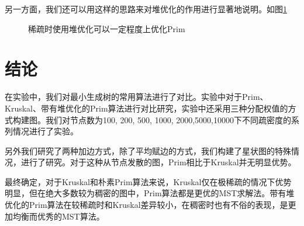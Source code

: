 \documentclass[UTF8]{ctexart}
\begin{document}
另一方面，我们还可以用这样的思路来对堆优化的作用进行显著地说明。如图\ref{fig:conclusion2}
\begin{figure}[htbp]
    \centering
    \caption{稀疏时使用堆优化可以一定程度上优化Prim}
    \label{fig:conclusion2}
\end{figure}

\section{结论}
在实验中，我们对最小生成树的常用算法进行了对比。实验中对于Prim、Kruskal、带有堆优化的Prim算法进行对比研究，实验中还采用三种分配权值的方式构建图。我们对节点数为100, 200, 500, 1000, 2000,5000,10000下不同疏密度的系列情况进行了实验。

另外我们研究了两种加边方式，除了平均赋边的方式，我们构建了星状图的特殊情况，进行了研究。对于这种从节点发散的图，Prim相比于Kruskal并无明显优势。

最终确定，对于Kruskal和朴素Prim算法来说，Kruskal仅在极稀疏的情况下优势明显，但在绝大多数较为稠密的图中，Prim算法都是更优的MST求解法。带有堆优化的Prim算法在较稀疏时和Kruskal差异较小，在稠密时也有不俗的表现，是更加均衡而优秀的MST算法。

\newpage
% 

\end{document}
